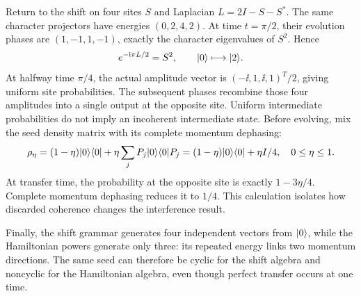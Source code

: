 Return to the shift on four sites $S$ and Laplacian $L=2I-S-S^*$. The same character projectors have energies $(0,2,4,2)$. At time $t=\pi/2$, their evolution phases are $(1,-1,1,-1)$, exactly the character eigenvalues of $S^2$. Hence
\[
e^{-\mathrm i\pi L/2}=S^2,\qquad
\lvert 0\rangle\longmapsto\lvert 2\rangle.
\]
At halfway time $\pi/4$, the actual amplitude vector is $(-\ii,1,\ii,1)^T/2$, giving uniform site probabilities. The subsequent phases recombine those four amplitudes into a single output at the opposite site. Uniform intermediate probabilities do not imply an incoherent intermediate state.
Before evolving, mix the seed density matrix with its complete momentum dephasing:
\[
\rho_\eta=(1-\eta)\lvert 0\rangle\langle 0\rvert+\eta\sum_jP_j\lvert 0\rangle\langle 0\rvert P_j
=(1-\eta)\lvert 0\rangle\langle 0\rvert+\eta I/4,
\quad0\le\eta\le1.
\]
At transfer time, the probability at the opposite site is exactly $1-3\eta/4$. Complete momentum dephasing reduces it to $1/4$. This calculation isolates how discarded coherence changes the interference result.

Finally, the shift grammar generates four independent vectors from $\lvert 0\rangle$, while the Hamiltonian powers generate only three: its repeated energy links two momentum directions. The same seed can therefore be cyclic for the shift algebra and noncyclic for the Hamiltonian algebra, even though perfect transfer occurs at one time.

